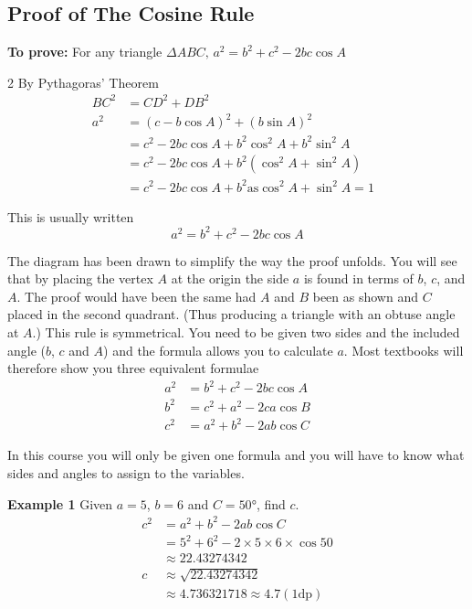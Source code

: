 \subsection*{Proof of The Cosine Rule}
\textbf{To prove:} For any triangle $ \Delta A B C\text{,}$ $a^{2} =b^{2} +c^{2} -2 b c \cos  A$ \\ 
\columnsep =30pt
\begin {multicols}{2}
\setlength\fboxrule{0in}\setlength\fboxsep{0.2in}
By Pythagoras' Theorem
\begin{align*}B C^{2} &  = C D^{2} +D B^{2} \\
a^{2} &  = \left (c -b \cos  A\right )^{2} +\left (b \sin  A\right )^{2} \\
&  = c^{2} -2 b c \cos  A +b^{2} \cos ^{2} A +b^{2} \sin ^{2} A \\
&  = c^{2} -2 b c \cos  A +b^{2} \left (\cos ^{2} A +\sin ^{2} A\right ) \\
&  = c^{2} -2 b c \cos  A +b^{2}\text{as}\cos ^{2} A +\sin ^{2} A =1\text{\ }\end{align*} 
\end {multicols}
This is usually written
\begin{equation*}a^{2} =b^{2} +c^{2} -2 b c \cos  A
\end{equation*}

The diagram has been drawn to simplify the way the proof unfolds. You will see that by placing the vertex $A$ at the origin the side $a$ is found in terms of $b$, $c$, and $A$. The proof would have been the same had $A$ and $B$ been as shown and $C$ placed in the second quadrant. (Thus producing a triangle with an obtuse angle at $A$.) This rule is symmetrical. You need to be given two sides and the included angle ($b$, $c$ and $A$) and the formula allows you to calculate $a$. Most textbooks will therefore show you three equivalent formulae
\begin{align*}a^{2} &  = b^{2} +c^{2} -2 b c \cos  A \\
b^{2} &  = c^{2} +a^{2} -2 c a \cos  B \\
c^{2} &  = a^{2} +b^{2} -2 a b \cos  C\end{align*}

In this course you will only be given one formula and you will have to know what sides and angles to assign to the variables. 

\textbf{Example 1}
Given $a =5$, $b =6$ and $C =\ang{50} $, find $c$.
\begin{align*}c^{2} &  = a^{2} +b^{2} -2 a b \cos  C \\
&  = 5^{2} +6^{2} -2 \times 5 \times 6 \times \cos  50  \\
&  \approx   22.43274342 \\
c &  \approx   \sqrt{22.43274342} \\
&  \approx   4.736321718 \approx 4.7 \left (1\text{dp}\right )\end{align*}

